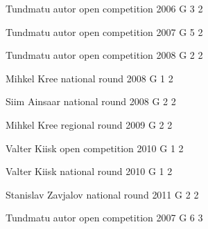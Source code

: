 \documentclass[11pt]{article}
\begin{document}
\ylDisplay{} %
{Tundmatu autor} %
{open competition} %
{2006} %
{G 3} %
{2} %
{

\ifEngSolution
\fi
}

\ylDisplay{} %
{Tundmatu autor} %
{open competition} %
{2007} %
{G 5} %
{2} %
{

\ifEngSolution
\fi
}

\ylDisplay{} %
{Tundmatu autor} %
{open competition} %
{2008} %
{G 2} %
{2} %
{

\ifEngSolution
\fi
}

\ylDisplay{} %
{Mihkel Kree} %
{national round} %
{2008} %
{G 1} %
{2} %
{

\ifEngSolution
\fi
}

\ylDisplay{} %
{Siim Ainsaar} %
{national round} %
{2008} %
{G 2} %
{2} %
{

\ifEngSolution
\fi
}

\ylDisplay{} %
{Mihkel Kree} %
{regional round} %
{2009} %
{G 2} %
{2} %
{

\ifEngSolution
\fi
}

\ylDisplay{} %
{Valter Kiisk} %
{open competition} %
{2010} %
{G 1} %
{2} %
{

\ifEngSolution
\fi
}

\ylDisplay{} %
{Valter Kiisk} %
{national round} %
{2010} %
{G 1} %
{2} %
{

\ifEngSolution
\fi
}

\ylDisplay{} %
{Stanislav Zavjalov} %
{national round} %
{2011} %
{G 2} %
{2} %
{

\ifEngSolution
\fi
}

\ylDisplay{} %
{Tundmatu autor} %
{open competition} %
{2007} %
{G 6} %
{3} %
{

\ifEngSolution
\fi
}
\end{document}
